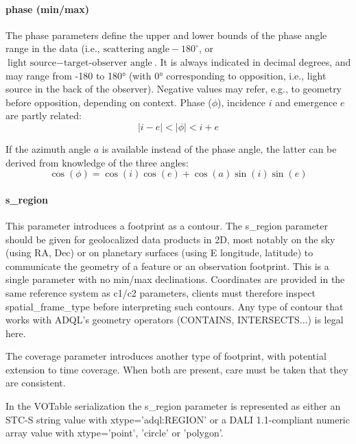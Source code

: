 \documentclass[11pt,a4paper]{ivoa}
\begin{document}
\paragraph{phase (min/max)}

The phase parameters define the upper and lower bounds of the phase
angle range in the data (i.e., $\textrm{scattering angle} - 180^\circ$, or
$\textrm{light source}-\textrm{target-observer angle}$.
It is always indicated in decimal degrees,
and may range from -180 to 180° (with 0° corresponding to opposition,
i.e., light source in the back of the observer). Negative values may
refer, e.g., to geometry before opposition, depending on context.
Phase ($\phi$), incidence $i$ and emergence $e$ are partly related:
\begin{displaymath}
  |i - e| < |\phi| < i + e
\end{displaymath}

If the azimuth angle $a$ is available instead of the phase angle,
the latter can be derived from knowledge of the three angles:
\begin{displaymath}
  \cos(\phi) = \cos(i) \cos(e) + \cos(a) \sin(i) \sin(e)
\end{displaymath}

\paragraph{s\_region}

This parameter introduces a footprint as a contour. The s\_region
parameter should be given for geolocalized data products in 2D, most
notably on the sky (using RA, Dec) or on planetary surfaces (using E
longitude, latitude) to communicate the geometry of a feature or an
observation footprint. This is a single parameter with no min/max
declinations. Coordinates are provided in the same reference system as
c1/c2 parameters, clients must therefore inspect spatial\_frame\_type
before interpreting such contours. Any type of contour that works with
ADQL's geometry operators (CONTAINS, INTERSECTS...) is legal here.

The coverage parameter introduces another type of footprint, with potential
extension to time coverage. When both are present, care must be taken
that they are consistent.

In the VOTable serialization the s\_region parameter is represented
as either an STC-S string value with xtype='adql:REGION' or a DALI
1.1-compliant numeric array value with xtype='point', 'circle' or
'polygon'.
\end{document}
